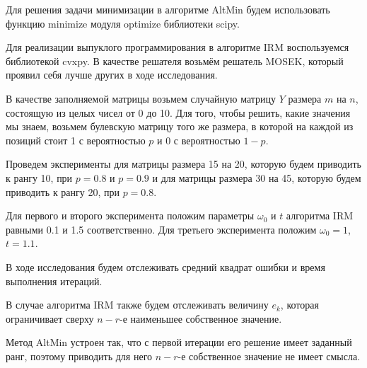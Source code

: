 \documentclass[oneside,final,14pt]{extreport} %
\begin{document}
Для решения задачи минимизации в алгоритме AltMin будем использовать функцию minimize модуля optimize библиотеки scipy.

Для реализации выпуклого программирования в алгоритме IRM воспользуемся библиотекой cvxpy. В качестве решателя возьмём решатель MOSEK, который проявил себя лучше других в ходе исследования.

В качестве заполняемой матрицы возьмем случайную матрицу $Y$ размера $m$ на $n$, состоящую из целых чисел от 0 до 10. Для того, чтобы решить, какие значения мы знаем, возьмем булевскую матрицу того же размера, в которой на каждой из позиций стоит 1 с вероятностью $p$ и 0 с вероятностью $1-p$.

Проведем эксперименты для матрицы размера 15 на 20, которую будем приводить к рангу 10, при $p = 0.8$ и $p = 0.9$ и для матрицы размера 30 на 45, которую будем приводить к рангу 20, при $p = 0.8$.

Для первого и второго эксперимента положим параметры $\omega_0$ и $t$ алгоритма IRM равными 0.1 и 1.5 соответственно. Для третьего эксперимента положим $\omega_0 = 1$, $t = 1.1$.

В ходе исследования будем отслеживать средний квадрат ошибки и время выполнения итераций.

В случае алгоритма IRM также будем отслеживать величину $e_k$, которая ограничивает сверху $n-r$-е наименьшее собственное значение.

Метод AltMin устроен так, что с первой итерации его решение имеет заданный ранг, поэтому приводить для него $n-r$-е собственное значение не имеет смысла.
\end{document}
